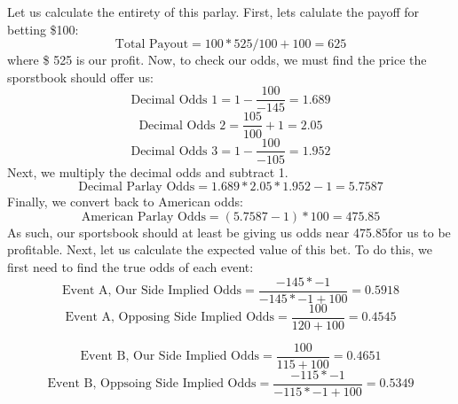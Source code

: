 \documentclass{article}
\begin{document}
Let us calculate the entirety of this parlay. First, lets calulate the payoff for betting \$100:
\begin{equation}
  \textrm{Total Payout} = 100*525/100 + 100 = 625
\end{equation}
where \$ 525 is our profit. 
Now, to check our odds, we must find the price the sporstbook should offer us:
\begin{equation}
  \textrm{Decimal Odds 1} = 1 - \frac{100}{-145} = 1.689
\end{equation}
\begin{equation}
  \textrm{Decimal Odds 2} = \frac{105}{100}+1 = 2.05
\end{equation}
\begin{equation}
  \textrm{Decimal Odds 3} = 1 - \frac{100}{-105} = 1.952
\end{equation}
Next, we multiply the decimal odds and subtract 1.
\begin{equation}
  \textrm{Decimal Parlay Odds} = 1.689*2.05*1.952 - 1 = 5.7587
\end{equation}
Finally, we convert back to American odds:
\begin{equation}
  \textrm{American Parlay Odds} = (5.7587-1)*100 = 475.85
\end{equation}
As such, our sportsbook should at least be giving us odds near 475.85for us to be profitable. 
Next, let us calculate the expected value of this bet. To do this, we first need to find the true odds of each event:
\begin{equation}
  \textrm{Event A, Our Side Implied Odds} = \frac{-145*-1}{-145*-1+100} = 0.5918
\end{equation}
\begin{equation}
  \textrm{Event A, Opposing Side Implied Odds} = \frac{100}{120+100} = 0.4545
\end{equation}

\begin{equation}
  \textrm{Event B, Our Side Implied Odds} = \frac{100}{115+100} = 0.4651
\end{equation}
\begin{equation}
  \textrm{Event B, Oppsoing Side Implied Odds} = \frac{-115*-1}{-115*-1+100} = 0.5349
\end{equation}
\end{document}
